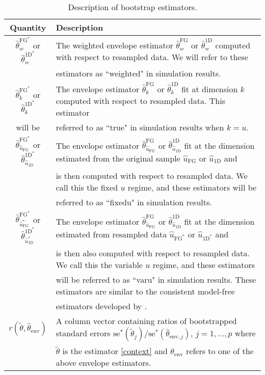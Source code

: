 \documentclass{article}\usepackage[]{graphicx}\usepackage[]{color}
\begin{document}
\begin{table}[t]
\footnotesize
\begin{tabular}{cl}
	Quantity & Description \\
	\hline 
	$\widehat\theta_w^{{\text{FG}}^{\textstyle{*}}}$ or $\widehat\theta_w^{{\text{1D}}^{\textstyle{*}}}$ & The weighted envelope estimator $\widehat\theta^{\text{FG}}_w$ or $\widehat\theta^{\text{1D}}_w$ computed with respect to resampled data. We will refer to these  \\
	& estimators as ``weighted" in simulation results. \\
	$\widehat{\theta}_k^{{\text{FG}}^{\textstyle{*}}}$ or $\widehat{\theta}_k^{\text{1D}^{\textstyle{*}}}$ & The envelope estimator $\widehat{\theta}_k^{\text{FG}}$ or $\widehat{\theta}_{k}^{\text{1D}}$ fit at dimension $k$ computed with respect to resampled data. This estimator \\ will be 
	& referred to as ``true" in simulation results when $k = u$. \\
	$\widehat{\theta}_{\hat u_{\text{FG}}}^{\text{FG}^{\textstyle{*}}}$ or $\widehat{\theta}_{\hat u_{\text{1D}}}^{\text{1D}^{\textstyle{*}}}$ & The envelope estimator $\widehat{\theta}_{\hat u_{\text{FG}}}^{\text{FG}}$ or $\widehat{\theta}_{\hat u_{\text{1D}}}^{\text{1D}}$ fit at the dimension estimated from the original sample $\hat u_{\text{FG}}$ or $\hat u_{\text{1D}}$ and \\ 
	& is then computed with respect to resampled data. We call this the fixed $u$ regime, and these estimators will be \\
	& referred to as ``fixedu" in simulation results. \\
	$\widehat{\theta}_{\hat u_{\text{FG}}^{\textstyle{*}}}^{\text{FG}^{\textstyle{*}}}$ or $\widehat{\theta}_{\hat u_{\text{1D}}^{{\textstyle{*}}}}^{\text{1D}^{\textstyle{*}}}$ & The envelope estimator $\widehat{\theta}_{\hat u_{\text{FG}}}^{\text{FG}}$ or $\widehat{\theta}_{\hat u_{\text{1D}}}^{\text{1D}}$ fit at the dimension estimated from resampled data $\hat u_{\text{FG}^{\textstyle{*}}}$ or $\hat u_{\text{1D}^{\textstyle{*}}}$ and \\ 
	& is then also computed with respect to resampled data. We call this the variable $u$ regime, and these estimators \\
	& will be referred to as ``varu" in simulation results. These estimators are  similar to the consistent model-free \\
	& estimators developed by \cite{zhangmai}.\\
	$r(\tilde\theta, \widehat\theta_{\text{env}})$ & A column vector containing ratios of bootstrapped standard errors $\text{se}^{*}(\tilde{\theta}_{j})/\text{se}^{*}(\widehat{\theta}_{\text{env},j})$, $j = 1,\ldots,p$ where \\
	& $\tilde\theta$ is the estimator \eqref{context} and $\widehat\theta_{\text{env}}$ refers to one of the above envelope estimators.  \\
	\hline
\end{tabular}
\caption{Description of bootstrap estimators.}
\label{tab:desc}	
\end{table}
\end{document}

